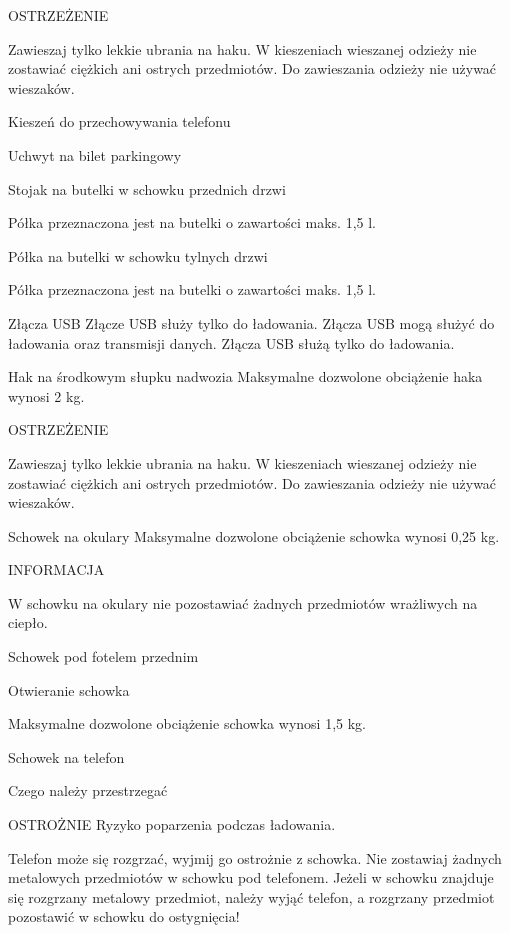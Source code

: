 OSTRZEŻENIE
\begin{itemizeTriangle}
	\itemTriangle Zawieszaj tylko lekkie ubrania na haku. W kieszeniach wieszanej odzieży nie zostawiać ciężkich ani ostrych przedmiotów.
	\itemTriangle Do zawieszania odzieży nie używać wieszaków.
\end{itemizeTriangle}

Kieszeń do przechowywania telefonu

Uchwyt na bilet parkingowy

Stojak na butelki w schowku przednich drzwi

Półka przeznaczona jest na butelki o zawartości maks. 1,5 l.

Półka na butelki w schowku tylnych drzwi


Półka przeznaczona jest na butelki o zawartości maks. 1,5 l.

Złącza USB
Złącze USB służy tylko do ładowania.
Złącza USB mogą służyć do ładowania oraz transmisji danych.
Złącza USB służą tylko do ładowania.

Hak na środkowym słupku nadwozia
Maksymalne dozwolone obciążenie haka wynosi 2 kg.

OSTRZEŻENIE
\begin{itemizeTriangle}
	\itemTriangle Zawieszaj tylko lekkie ubrania na haku. W kieszeniach wieszanej odzieży nie zostawiać ciężkich ani ostrych przedmiotów.
	\itemTriangle Do zawieszania odzieży nie używać wieszaków.
\end{itemizeTriangle}

Schowek na okulary
Maksymalne dozwolone obciążenie schowka wynosi 0,25 kg.

INFORMACJA
\begin{itemizeTriangle}
	\itemTriangle W schowku na okulary nie pozostawiać żadnych przedmiotów wrażliwych na ciepło.
\end{itemizeTriangle}

Schowek pod fotelem przednim

Otwieranie schowka

Maksymalne dozwolone obciążenie schowka wynosi 1,5 kg.

Schowek na telefon

Czego należy przestrzegać

OSTROŻNIE
Ryzyko poparzenia podczas ładowania.
\begin{itemizeTriangle}
	\itemTriangle Telefon może się rozgrzać, wyjmij go ostrożnie z schowka.
	\itemTriangle Nie zostawiaj żadnych metalowych przedmiotów w schowku pod telefonem. Jeżeli w schowku znajduje się rozgrzany metalowy przedmiot, należy wyjąć telefon, a rozgrzany przedmiot pozostawić w schowku do ostygnięcia!
\end{itemizeTriangle}

